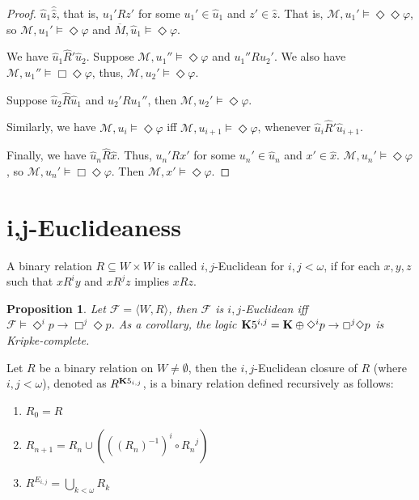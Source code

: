 \documentclass[a4paper]{article}
\theoremstyle{defin}
\theoremstyle{theorem}
\theoremstyle{prop}
\newtheorem{prop}{Proposition}
\theoremstyle{lemma}
\theoremstyle{fact}
\theoremstyle{ex}
\theoremstyle{col}
\theoremstyle{claim}
\begin{document}
\begin{proof}
  \vspace{\baselineskip}

  $\hat{u}_1 \widehat \hat{z}$, that is, $u_1' R z'$ for some $u_1' \in \hat{u}_1$ and $z' \in \hat{z}$.
  That is, $\mathcal{M}, u_1' \models \Diamond \Diamond \varphi$, so $\mathcal{M}, u_1' \models \Diamond \varphi$ and $\overline{M}, \hat{u}_1 \models \Diamond \varphi$.

  We have $\hat{u}_1 \widehat{R}' \hat{u}_2$. Suppose $\mathcal{M}, u_1'' \models \Diamond \varphi$ and $u_1'' R u_2'$.
  We also have $\mathcal{M}, u_1'' \models \Box \Diamond \varphi$, thus, $\mathcal{M}, u_2' \models \Diamond \varphi$.

  Suppose $\hat{u}_2 \widehat{R} \hat{u}_1$ and $u_2' R u_1''$, then $\mathcal{M}, u_2' \models \Diamond \varphi$.

  Similarly, we have $\mathcal{M}, u_i \models \Diamond \varphi$ iff $\mathcal{M}, u_{i + 1} \models \Diamond \varphi$, whenever $\hat{u}_i \widehat{R}' \hat{u}_{i + 1}$.

  Finally, we have $\hat{u}_n \widehat{R} \hat{x}$. Thus, $u_n' R x'$ for some $u_n' \in \hat{u}_n$ and $x' \in \hat{x}$. $\mathcal{M}, u_n' \models \Diamond \varphi$, so $\mathcal{M}, u_n' \models \Box \Diamond \varphi$. Then $\mathcal{M}, x' \models \Diamond \varphi$.
\end{proof}

\section{i,j-Euclideaness}

A binary relation $R \subseteq W \times W$ is called $i,j$-Euclidean for $i, j < \omega$, if for each $x, y, z$ such that $x R^{i} y$ and $x R^{j} z$ implies $x R z$.

\begin{prop}
  Let $\mathcal{F} = \langle W, R \rangle$, then $\mathcal{F}$ is $i,j$-Euclidean iff $\mathcal{F} \models \Diamond^i p \to \Box^j \Diamond p$. As a corollary, the logic ${\bf K}5^{i,j} = {\bf K} \oplus \Diamond^i p \to \Box^j \Diamond p$ is Kripke-complete.
\end{prop}

Let $R$ be a binary relation on $W \neq \emptyset$, then the $i,j$-Euclidean closure of $R$ (where $i, j < \omega$), denoted as $R^{{\bf K}5_{i,j}}$, is a binary relation defined recursively as follows:
\begin{enumerate}
  \item $R_0 = R$
  \item $R_{n + 1} = R_n \cup (((R_n)^{-1})^i \circ {R_n}^j)$
  \item $R^{E_{i,j}} = \bigcup \limits_{k < \omega} R_k$
\end{enumerate}
\end{document}
